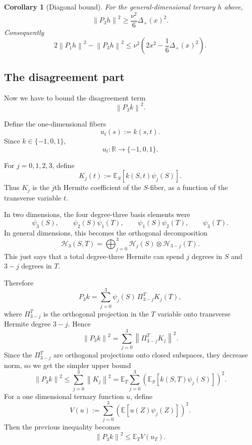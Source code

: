 \documentclass[11pt]{article}
\newtheorem{corollary}[theorem]{Corollary}
\numberwithin{equation}{section}
\newcommand{\R}{\mathbb R}
\newcommand{\E}{\mathbb E}
\newcommand{\norm}[1]{\left\|#1\right\|}
\newcommand{\cH}{\mathcal H}
\begin{document}
\begin{corollary}[Diagonal bound]
For the general-dimensional ternary $h$ above,
\[
        \norm{P_3h}^2\ge \frac{\nu^2}{6}\Delta_+(x)^2.
\]
Consequently
\[
        2\norm{P_1h}^2-\norm{P_3h}^2
        \le
        \nu^2\left(2x^2-\frac16\Delta_+(x)^2\right).
\]
\end{corollary}

\subsection{The disagreement part}
\label{sec:disagreement}

Now we have to bound the disagreement term
\[
        \norm{P_3k}^2.
\]

Define the one-dimensional fibers
\[
        u_t(s):=k(s,t).
\]
Since $k\in\{-1,0,1\}$,
\[
        u_t:\R\to\{-1,0,1\}.
\]

For $j=0,1,2,3$, define
\[
        K_j(t):=\E_S[k(S,t)\psi_j(S)].
\]
Thus $K_j$ is the $j$th Hermite coefficient of the $S$-fiber, as a function of the transverse variable $t$.

In two dimensions, the four degree-three basis elements were
\[
        \psi_3(S),\qquad
        \psi_2(S)\psi_1(T),\qquad
        \psi_1(S)\psi_2(T),\qquad
        \psi_3(T).
\]
In general dimensions, this becomes the orthogonal decomposition
\[
        \cH_3(S,T)
        =\bigoplus_{j=0}^3 \cH_j(S)\otimes \cH_{3-j}(T).
\]
This just says that a total degree-three Hermite can spend $j$ degrees in $S$ and $3-j$ degrees in $T$.

Therefore
\[
        P_3k
        =\sum_{j=0}^3 \psi_j(S)\,\Pi^T_{3-j}K_j(T),
\]
where $\Pi^T_{3-j}$ is the orthogonal projection in the $T$ variable onto transverse Hermite degree $3-j$. Hence
\begin{equation}
        \norm{P_3k}^2
        =\sum_{j=0}^3 \norm{\Pi^T_{3-j}K_j}^2.
        \label{eq:p3k-decomposition}
\end{equation}
Since the $\Pi^T_{3-j}$ are orthogonal projections onto closed subspaces, they decrease norm, so we get the simpler upper bound
\[
        \norm{P_3k}^2
        \le \sum_{j=0}^3\norm{K_j}^2
        =\E_T\sum_{j=0}^3\left(\E_S[k(S,T)\psi_j(S)]\right)^2.
\]
For a one dimensional ternary function $u$, define
\[
        V(u):=\sum_{j=0}^3\left(\E[u(Z)\psi_j(Z)]\right)^2.
\]
Then the previous inequality becomes
\begin{equation}
        \boxed{\norm{P_3k}^2\le \E_T V(u_T).}
        \label{eq:p3k-fiber-bound}
\end{equation}
\end{document}
